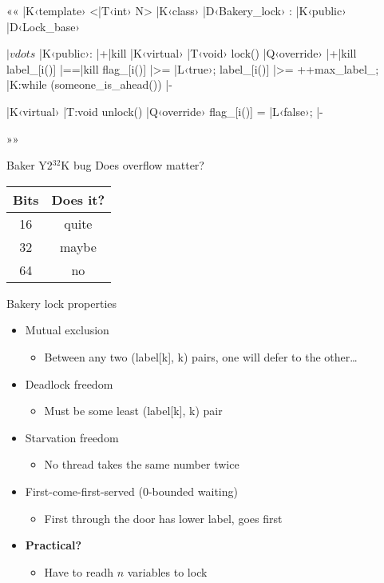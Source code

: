 \documentclass{beamer}
\begin{document}
\begin{frame}[fragile]{}{}
  ««
  |K‹template› <|T‹int› N>
  |K‹class› |D‹Bakery_lock› : |K‹public› |D‹Lock_base›
  {
  $|vdots$
  |K‹public›:
  	|+|kill%
    |K‹virtual› |T‹void› lock() |Q‹override›
    {
    	|+|kill%
      label_[i()] |==|kill%
      flag_[i()]  |>= |L‹true›;
      label_[i()] |>= ++max_label_;
      |K:while (someone_is_ahead()) {} |-
    }
    
    |K‹virtual› |T:void unlock() |Q‹override›
    { flag_[i()] = |L‹false›; } |-
  }
  »»
\end{frame}

\begin{frame}{Baker Y2$^{\text{32}}$K bug}{}
  Does overflow matter?

  \centering
  \begin{tabular}{|c|c|}
    \hline
    \textbf{Bits} & \textbf{Does it?} \\
    \hline
    \hline
    16 & quite \\
    32 & maybe \\
    64 & no \\
    \hline
  \end{tabular}
\end{frame}

\begin{frame}{Bakery lock properties}
  \begin{itemize}
    \item Mutual exclusion
      \begin{itemize}
        \item Between any two (label[k], k) pairs, one will defer to the
          other\ldots
      \end{itemize}
    \item Deadlock freedom
      \begin{itemize}
        \item Must be some least (label[k], k) pair
      \end{itemize}
    \item Starvation freedom
      \begin{itemize}
        \item No thread takes the same number twice
      \end{itemize}
    \item First-come-first-served (0-bounded waiting)
      \begin{itemize}
        \item First through the door has lower label, goes first
      \end{itemize}
      \pause
    \item \textbf{Practical?}
      \begin{itemize}
        \item Have to readh $n$ variables to lock
      \end{itemize}
  \end{itemize}
\end{frame}
\end{document}
